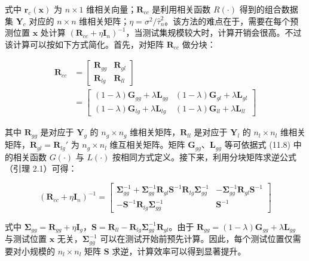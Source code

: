 \documentclass{ctexart}
\begin{document}
式中 $\boldsymbol{r}_c(\boldsymbol{x})$ 为 $n\times1$ 维相关向量；$\boldsymbol{R}_{cc}$ 是利用相关函数 $R(\cdot)$ 得到的组合数据集 $\boldsymbol{Y}_c$ 对应的 $n\times n$ 维相关矩阵；$\eta=\sigma^2/\widehat{\tau}_n^2$。该方法的难点在于，需要在每个预测位置 $\boldsymbol{x}$ 处计算 $(\boldsymbol{R}_{cc}+\eta\boldsymbol{I}_n)^{-1}$，当测试集规模较大时，计算开销会很高。不过该计算可以按如下方式简化。首先，对矩阵 $\boldsymbol{R}_{cc}$ 做分块：

\begin{align*}
\boldsymbol{R}_{cc}&=\begin{bmatrix}
\boldsymbol{R}_{gg} &\boldsymbol{R}_{gl}\\
\boldsymbol{R}_{lg} &\boldsymbol{R}_{ll}
\end{bmatrix}\\
&=\begin{bmatrix}
(1-\lambda)\boldsymbol{G}_{gg}+\lambda\boldsymbol{L}_{gg} & (1-\lambda)\boldsymbol{G}_{gl}+\lambda\boldsymbol{L}_{gl}\\
(1-\lambda)\boldsymbol{G}_{lg}+\lambda\boldsymbol{L}_{lg} & (1-\lambda)\boldsymbol{G}_{ll}+\lambda\boldsymbol{L}_{ll}
\end{bmatrix}
\end{align*}

其中 $\boldsymbol{R}_{gg}$ 是对应于 $\boldsymbol{Y}_g$ 的 $n_g\times n_g$ 维相关矩阵，$\boldsymbol{R}_{ll}$ 是对应于 $\boldsymbol{Y}_l$ 的 $n_l\times n_l$ 维相关矩阵，$\boldsymbol{R}_{gl}=\boldsymbol{R}_{lg}'$ 为 $n_g\times n_l$ 维互相关矩阵。矩阵 $\boldsymbol{G}_{gg}$、$\boldsymbol{L}_{gg}$ 等可依据式 (11.8) 中的相关函数 $G(\cdot)$ 与 $L(\cdot)$ 按相同方式定义。接下来，利用分块矩阵求逆公式（引理 2.1）可得：

\begin{equation*}
(\boldsymbol{R}_{cc}+\eta\boldsymbol{I}_n)^{-1}=\begin{bmatrix}
\boldsymbol{\Sigma}_{gg}^{-1}+\boldsymbol{\Sigma}_{gg}^{-1}\boldsymbol{R}_{gl}\boldsymbol{S}^{-1}\boldsymbol{R}_{lg}\boldsymbol{\Sigma}_{gg}^{-1} & -\boldsymbol{\Sigma}_{gg}^{-1}\boldsymbol{R}_{gl}\boldsymbol{S}^{-1}\\
-\boldsymbol{S}^{-1}\boldsymbol{R}_{lg}\boldsymbol{\Sigma}_{gg}^{-1} &\boldsymbol{S}^{-1}\end{bmatrix}
\tag{11.9}
\end{equation*}

式中 $\boldsymbol{\Sigma}_{gg}=\boldsymbol{R}_{gg}+\eta\boldsymbol{I}_g$，$\boldsymbol{S}=\boldsymbol{R}_{ll}-\boldsymbol{R}_{lg}\boldsymbol{\Sigma}_{gg}^{-1}\boldsymbol{R}_{gl}$。由于 $\boldsymbol{R}_{gg}=(1-\lambda)\boldsymbol{G}_{gg}+\lambda\boldsymbol{L}_{gg}$ 与测试位置 $\boldsymbol{x}$ 无关，$\boldsymbol{\Sigma}_{gg}^{-1}$ 可以在测试开始前预先计算。因此，每个测试位置仅需要对小规模的 $n_l\times n_l$ 矩阵 $\boldsymbol{S}$ 求逆，计算效率可以得到显著提升。
\end{document}
